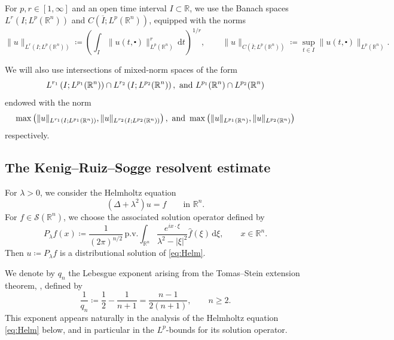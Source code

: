 \documentclass[11pt,a4paper]{amsart}
\theoremstyle{remark}
\theoremstyle{definition}
\newcommand{\R}{\mathbb{R}}
\newcommand{\dd}{\mathrm{d}}
\def\cd{\centerdot}
\begin{document}
For $p,r\in[1,\infty]$ and an open time interval $I\subset\R$, we use the Banach spaces $L^r\left (I;L^p(\R^n)\right )$ and $C\left (\overline{I};L^p(\R^n)\right )$, equipped with the norms
\begin{equation}\label{eq:Bvalued_norms}
\|u\|_{L^r\left(I;L^p(\R^n)\right)} \coloneqq
\left( \int_I \|u(t,\cd)\|_{L^p(\R^n)}^r\,\dd t \right)^{1/r}, \qquad \|u\|_{C\left(\overline{I};L^p(\R^n)\right)} \coloneqq \sup_{t\in I}\|u(t,\cd)\|_{L^p(\R^n)}.
\end{equation}


We will also use intersections of mixed-norm spaces of the form
\[
L^{r_1}\left (I;L^{p_1}(\R^n)\right )\cap L^{r_2}\left(I;L^{p_2}(\R^n)\right), \textnormal{ and } L^{p_1}(\R^n)\cap L^{p_2}(\R^n)
\]
endowed with the norm
\[
\max\left( \|u\|_{L^{r_1}\left(I;L^{p_1}(\R^n)\right)}, \|u\|_{L^{r_2}\left(I;L^{p_2}(\R^n)\right)}\right) , \textnormal{ and } \max\left( \|u\|_{L^{p_1}(\R^n)}, \|u\|_{L^{p_2}(\R^n)}\right)
\]
respectively.


\subsection{The Kenig--Ruiz--Sogge resolvent estimate}\label{sec:KRS} For $\lambda>0$, we consider the Helmholtz equation
\begin{equation}\label{eq:Helm}
(\Delta+\lambda^2)u=f \qquad \text{in } \R^n.
\end{equation}
For $f\in\mathcal S(\R^n)$, we choose the associated solution operator defined by
\begin{equation}\label{eq:soloper}
P_\lambda f(x) \coloneqq \frac{1}{(2\pi)^{n/2}} \,\mathrm{p.v.}\!\int_{\R^n} \frac{e^{ix\cdot\xi}}{\lambda^2-|\xi|^2} \widehat f(\xi)\,\dd\xi, \qquad x\in\R^n.
\end{equation}
Then $u\coloneqq P_\lambda f$ is a distributional solution of \eqref{eq:Helm}.

We denote by $q_n$ the Lebesgue exponent arising from the Tomas--Stein extension theorem, \cites{stein,Tomas}, defined by
\begin{equation}\label{eq:extLq}
\frac{1}{q_n} \coloneqq \frac{1}{2}-\frac{1}{n+1}=\frac{n-1}{2(n+1)}, \qquad n\geq 2.
\end{equation}
This exponent appears naturally in the analysis of the Helmholtz equation \eqref{eq:Helm} below, and in particular in the $L^p$-bounds for its solution operator.
\end{document}
